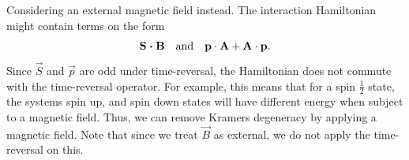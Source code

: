 Considering an external magnetic field instead. The interaction Hamiltonian might contain terms on the form
\begin{equation}
    \bm{\mathrm{S\cdot \bm{\mathrm{B}}}} \quad\text{and}\quad \bm{\mathrm{p}}\cdot\bm{\mathrm{A}} + \bm{\mathrm{A}}\cdot \bm{\mathrm{p}}.
\end{equation}
Since $\vec{S}$ and $\vec{p}$ are odd under time-reversal, the Hamiltonian does not commute with the time-reversal operator. For example, this means that for a spin $\frac{1}{2}$ state, the systems spin up, and spin down states will have different energy when subject to a magnetic field. Thus, we can remove Kramers degeneracy by applying a magnetic field. Note that since we treat $\vec{B}$ as external, we do not apply the time-reversal on this.